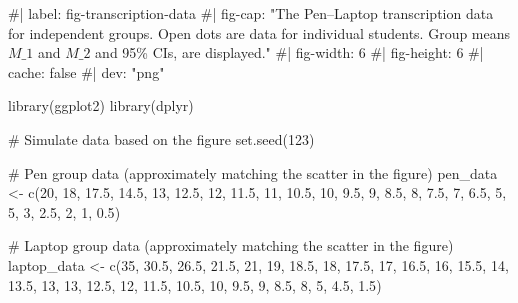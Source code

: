 \documentclass[
  letterpaper,
  DIV=11,
  numbers=noendperiod]{scrreprt}
\newenvironment{Shaded}{\begin{snugshade}}{\end{snugshade}}
\newcommand{\CommentTok}[1]{\textcolor[rgb]{0.37,0.37,0.37}{#1}}
\newcommand{\DecValTok}[1]{\textcolor[rgb]{0.68,0.00,0.00}{#1}}
\newcommand{\FloatTok}[1]{\textcolor[rgb]{0.68,0.00,0.00}{#1}}
\newcommand{\FunctionTok}[1]{\textcolor[rgb]{0.28,0.35,0.67}{#1}}
\newcommand{\NormalTok}[1]{\textcolor[rgb]{0.00,0.23,0.31}{#1}}
\newcommand{\OtherTok}[1]{\textcolor[rgb]{0.00,0.23,0.31}{#1}}
\begin{document}
\begin{Shaded}
\begin{Highlighting}[]
\CommentTok{\#| label: fig{-}transcription{-}data}
\CommentTok{\#| fig{-}cap: "The Pen–Laptop transcription data for independent groups. Open dots are data for individual students. Group means $M\_1$ and $M\_2$ and 95\% CIs, are displayed."}
\CommentTok{\#| fig{-}width: 6}
\CommentTok{\#| fig{-}height: 6}
\CommentTok{\#| cache: false}
\CommentTok{\#| dev: "png"}

\FunctionTok{library}\NormalTok{(ggplot2)}
\FunctionTok{library}\NormalTok{(dplyr)}

\CommentTok{\# Simulate data based on the figure}
\FunctionTok{set.seed}\NormalTok{(}\DecValTok{123}\NormalTok{)}

\CommentTok{\# Pen group data (approximately matching the scatter in the figure)}
\NormalTok{pen\_data }\OtherTok{\textless{}{-}} \FunctionTok{c}\NormalTok{(}\DecValTok{20}\NormalTok{, }\DecValTok{18}\NormalTok{, }\FloatTok{17.5}\NormalTok{, }\FloatTok{14.5}\NormalTok{, }\DecValTok{13}\NormalTok{, }\FloatTok{12.5}\NormalTok{, }\DecValTok{12}\NormalTok{, }\FloatTok{11.5}\NormalTok{, }\DecValTok{11}\NormalTok{, }\FloatTok{10.5}\NormalTok{, }\DecValTok{10}\NormalTok{, }\FloatTok{9.5}\NormalTok{, }\DecValTok{9}\NormalTok{, }
              \FloatTok{8.5}\NormalTok{, }\DecValTok{8}\NormalTok{, }\FloatTok{7.5}\NormalTok{, }\DecValTok{7}\NormalTok{, }\FloatTok{6.5}\NormalTok{, }\DecValTok{5}\NormalTok{, }\DecValTok{5}\NormalTok{, }\DecValTok{3}\NormalTok{, }\FloatTok{2.5}\NormalTok{, }\DecValTok{2}\NormalTok{, }\DecValTok{1}\NormalTok{, }\FloatTok{0.5}\NormalTok{)}

\CommentTok{\# Laptop group data (approximately matching the scatter in the figure)}
\NormalTok{laptop\_data }\OtherTok{\textless{}{-}} \FunctionTok{c}\NormalTok{(}\DecValTok{35}\NormalTok{, }\FloatTok{30.5}\NormalTok{, }\FloatTok{26.5}\NormalTok{, }\FloatTok{21.5}\NormalTok{, }\DecValTok{21}\NormalTok{, }\DecValTok{19}\NormalTok{, }\FloatTok{18.5}\NormalTok{, }\DecValTok{18}\NormalTok{, }\FloatTok{17.5}\NormalTok{, }\DecValTok{17}\NormalTok{, }\FloatTok{16.5}\NormalTok{, }\DecValTok{16}\NormalTok{, }
                 \FloatTok{15.5}\NormalTok{, }\DecValTok{14}\NormalTok{, }\FloatTok{13.5}\NormalTok{, }\DecValTok{13}\NormalTok{, }\DecValTok{13}\NormalTok{, }\FloatTok{12.5}\NormalTok{, }\DecValTok{12}\NormalTok{, }\FloatTok{11.5}\NormalTok{, }\FloatTok{10.5}\NormalTok{, }\DecValTok{10}\NormalTok{, }\FloatTok{9.5}\NormalTok{, }\DecValTok{9}\NormalTok{, }
                 \FloatTok{8.5}\NormalTok{, }\DecValTok{8}\NormalTok{, }\DecValTok{5}\NormalTok{, }\FloatTok{4.5}\NormalTok{, }\FloatTok{1.5}\NormalTok{)}


\end{Highlighting}
\end{Shaded}
\end{document}
